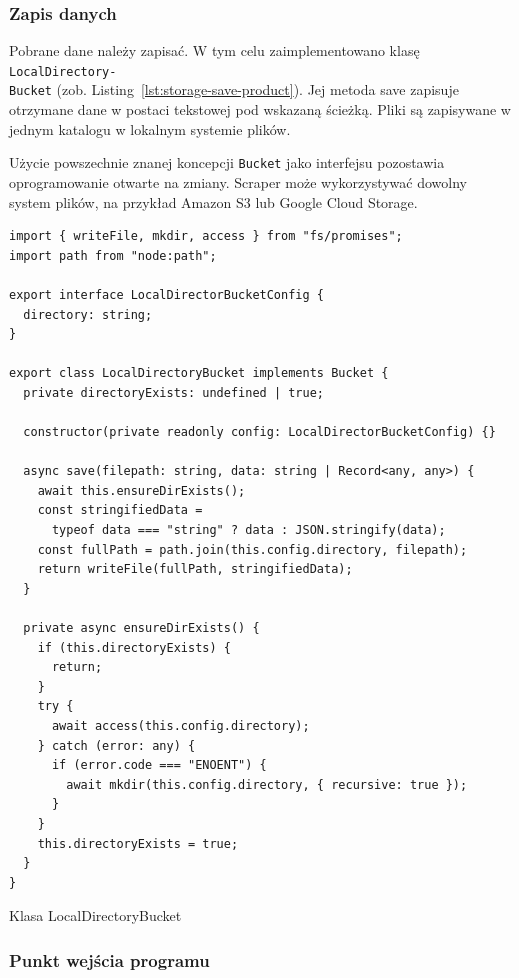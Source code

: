 \subsubsection{Zapis danych}

Pobrane dane należy zapisać.
W tym celu zaimplementowano klasę \texttt{LocalDirectory-\\Bucket} (zob. Listing~\ref{lst:storage-save-product}).
Jej metoda save zapisuje otrzymane dane w postaci tekstowej pod wskazaną ścieżką.
Pliki są zapisywane w jednym katalogu w lokalnym systemie plików.

Użycie powszechnie znanej koncepcji \texttt{Bucket} jako interfejsu pozostawia oprogramowanie otwarte na zmiany.
Scraper może wykorzystywać dowolny system plików, na przykład Amazon S3 lub Google Cloud Storage.

\begin{listing}[p]
    \begin{verbatim}
import { writeFile, mkdir, access } from "fs/promises";
import path from "node:path";

export interface LocalDirectorBucketConfig {
  directory: string;
}

export class LocalDirectoryBucket implements Bucket {
  private directoryExists: undefined | true;

  constructor(private readonly config: LocalDirectorBucketConfig) {}

  async save(filepath: string, data: string | Record<any, any>) {
    await this.ensureDirExists();
    const stringifiedData =
      typeof data === "string" ? data : JSON.stringify(data);
    const fullPath = path.join(this.config.directory, filepath);
    return writeFile(fullPath, stringifiedData);
  }

  private async ensureDirExists() {
    if (this.directoryExists) {
      return;
    }
    try {
      await access(this.config.directory);
    } catch (error: any) {
      if (error.code === "ENOENT") {
        await mkdir(this.config.directory, { recursive: true });
      }
    }
    this.directoryExists = true;
  }
}
    \end{verbatim}
    \caption{Klasa LocalDirectoryBucket}
    \label{lst:storage-save-product}
\end{listing}

\newpage

\subsubsection{Punkt wejścia programu}


